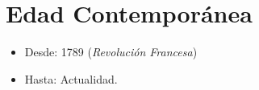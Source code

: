 \section{Edad Contemporánea}

\begin{itemize}

\item Desde: 1789 (\emph{Revolución Francesa})
\item Hasta: Actualidad.


\newpage


\end{itemize}